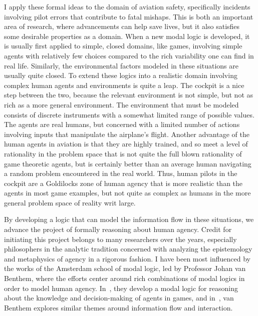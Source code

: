 I apply these formal ideas to the domain of aviation safety, specifically incidents involving pilot errors that contribute to fatal mishaps. This is both an important area of research, where advancements can help save lives, but it also satisfies some desirable properties as a domain. When a new modal logic is developed, it is usually first applied to simple, closed domains, like games, involving simple agents with relatively few choices compared to the rich variability one can find in real life. Similarly, the environmental factors modeled in these situations are usually quite closed. To extend these logics into a realistic domain involving complex human agents and environments is quite a leap. The cockpit is a nice step between the two, because the relevant environment is not simple, but not as rich as a more general environment. The environment that must be modeled consists of discrete instruments with a somewhat limited range of possible values. The agents are real humans, but concerned with a limited number of actions involving inputs that manipulate the airplane's flight. Another advantage of the human agents in aviation is that they are highly trained, and so meet a level of rationality in the problem space that is not quite the full blown rationality of game theoretic agents, but is certainly better than an average human navigating a random problem encountered in the real world. Thus, human pilots in the cockpit are a Goldilocks zone of human agency that is more realistic than the agents in most game examples, but not quite as complex as humans in the more general problem space of reality writ large.

By developing a logic that can model the information flow in these situations, we advance the project of formally reasoning about human agency. Credit for initiating this project belongs to many researchers over the years, especially philosophers in the analytic tradition concerned with analyzing the epistemology and metaphysics of agency in a rigorous fashion. I have been most influenced by the works of the Amsterdam school of modal logic, led by Professor Johan van Benthem, where the efforts center around rich combinations of modal logics in order to model human agency. In~\cite{VB_TowardPlay}, they develop a modal logic for reasoning about the knowledge and decision-making of agents in games, and in~\cite{VB_LDII}, van Benthem explores similar themes around information flow and interaction. 

